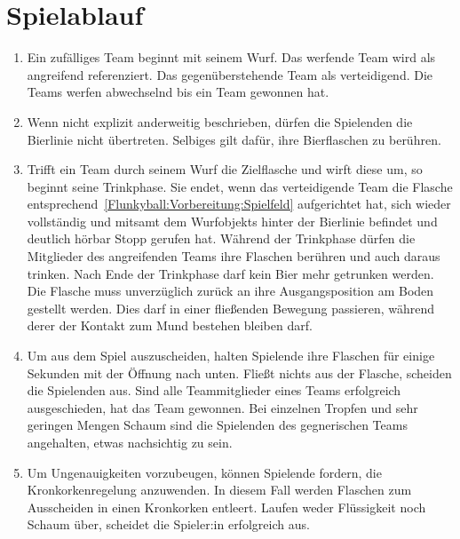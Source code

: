 \section{Spielablauf}
\begin{enumerate}[label={(\arabic*)}]    
    \item
    Ein zufälliges Team beginnt mit seinem Wurf.
    Das werfende Team wird als \glqq{}angreifend\grqq{} referenziert.
    Das gegenüberstehende Team als \glqq{}verteidigend\grqq{}.
    Die Teams werfen abwechselnd bis ein Team gewonnen hat.

    \item
    Wenn nicht explizit anderweitig beschrieben, dürfen die Spielenden die Bierlinie nicht übertreten.
    Selbiges gilt dafür, ihre Bierflaschen zu berühren.

    \item
    Trifft ein Team durch seinem Wurf die Zielflasche und wirft diese um, so beginnt seine Trinkphase.
    Sie endet, wenn das verteidigende Team die Flasche entsprechend~\ref{Flunkyball:Vorbereitung:Spielfeld} aufgerichtet hat, sich wieder vollständig und mitsamt dem Wurfobjekts hinter der Bierlinie befindet und deutlich hörbar \glqq{}Stopp\grqq{} gerufen hat.
    Während der Trinkphase dürfen die Mitglieder des angreifenden Teams ihre Flaschen berühren und auch daraus trinken.
    Nach Ende der Trinkphase darf kein Bier mehr getrunken werden.
    Die Flasche muss unverzüglich zurück an ihre Ausgangsposition am Boden gestellt werden.
    Dies darf in einer fließenden Bewegung passieren, während derer der Kontakt zum Mund bestehen bleiben darf.

    \item
    Um aus dem Spiel auszuscheiden, halten Spielende ihre Flaschen für einige Sekunden mit der Öffnung nach unten.
    Fließt nichts aus der Flasche, scheiden die Spielenden aus.
    Sind alle Teammitglieder eines Teams erfolgreich ausgeschieden, hat das Team gewonnen.
    Bei einzelnen Tropfen und sehr geringen Mengen Schaum sind die Spielenden des gegnerischen Teams angehalten, etwas nachsichtig zu sein.

    \item
    Um Ungenauigkeiten vorzubeugen, können Spielende fordern, die Kronkorkenregelung anzuwenden.
    In diesem Fall werden Flaschen zum Ausscheiden in einen Kronkorken entleert.
    Laufen weder Flüssigkeit noch Schaum über, scheidet die Spieler:in erfolgreich aus.
\end{enumerate}

